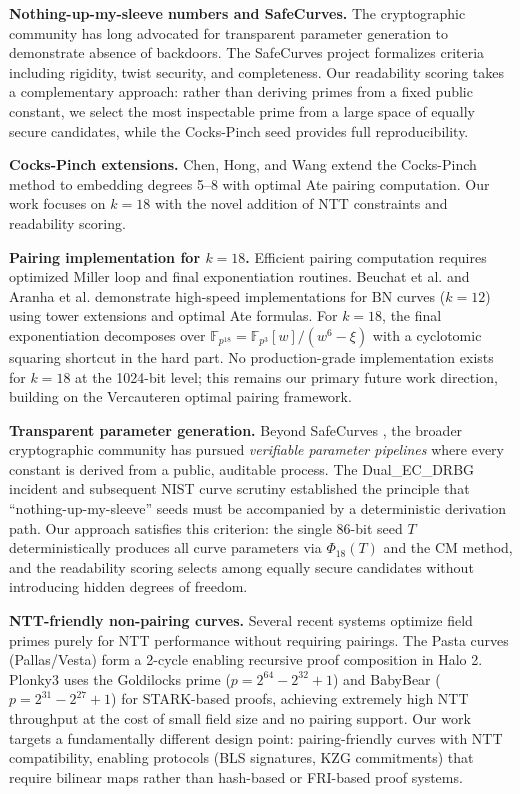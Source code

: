 \textbf{Nothing-up-my-sleeve numbers and SafeCurves.} The cryptographic
community has long advocated for transparent parameter generation to
demonstrate absence of backdoors. The SafeCurves project
\cite{SafeCurves} formalizes criteria including rigidity, twist
security, and completeness. Our readability scoring takes a
complementary approach: rather than deriving primes from a fixed public
constant, we select the most inspectable prime from a large space of
equally secure candidates, while the Cocks-Pinch seed provides full
reproducibility.

\textbf{Cocks-Pinch extensions.} Chen, Hong, and Wang
\cite{CocksPinchK5K8} extend the Cocks-Pinch method to embedding
degrees 5--8 with optimal Ate pairing computation. Our work focuses on
\(k=18\) with the novel addition of NTT constraints and readability
scoring.

\textbf{Pairing implementation for \(k=18\).} Efficient pairing
computation requires optimized Miller loop and final exponentiation
routines. Beuchat et al. \cite{Beuchat2010} and Aranha et al.
\cite{Aranha2011} demonstrate high-speed implementations for BN curves
(\(k=12\)) using tower extensions and optimal Ate formulas. For
\(k=18\), the final exponentiation decomposes over
\(\mathbb{F}_{p^{18}} = \mathbb{F}_{p^3}[w]/(w^6 - \xi)\) with a
cyclotomic squaring shortcut in the hard part. No production-grade
implementation exists for \(k=18\) at the 1024-bit level; this remains
our primary future work direction, building on the Vercauteren
\cite{Vercauteren2010} optimal pairing framework.

\textbf{Transparent parameter generation.} Beyond SafeCurves
\cite{SafeCurves}, the broader cryptographic community has pursued
\emph{verifiable parameter pipelines} where every constant is derived
from a public, auditable process. The Dual\_EC\_DRBG incident
\cite{DualECDRBG} and subsequent NIST curve scrutiny established the
principle that ``nothing-up-my-sleeve'' seeds must be accompanied by a
deterministic derivation path. Our approach satisfies this criterion:
the single 86-bit seed \(T\) deterministically produces all curve
parameters via \(\Phi_{18}(T)\) and the CM method, and the readability
scoring selects among equally secure candidates without introducing
hidden degrees of freedom.

\textbf{NTT-friendly non-pairing curves.} Several recent systems
optimize field primes purely for NTT performance without requiring
pairings. The Pasta curves (Pallas/Vesta) \cite{PastaCurves} form a
2-cycle enabling recursive proof composition in Halo 2. Plonky3
\cite{Plonky3} uses the Goldilocks prime (\(p = 2^{64} - 2^{32} + 1\))
and BabyBear (\(p = 2^{31} - 2^{27} + 1\)) for STARK-based proofs,
achieving extremely high NTT throughput at the cost of small field size
and no pairing support. Our work targets a fundamentally different
design point: pairing-friendly curves with NTT compatibility, enabling
protocols (BLS signatures, KZG commitments) that require bilinear maps
rather than hash-based or FRI-based proof systems.
